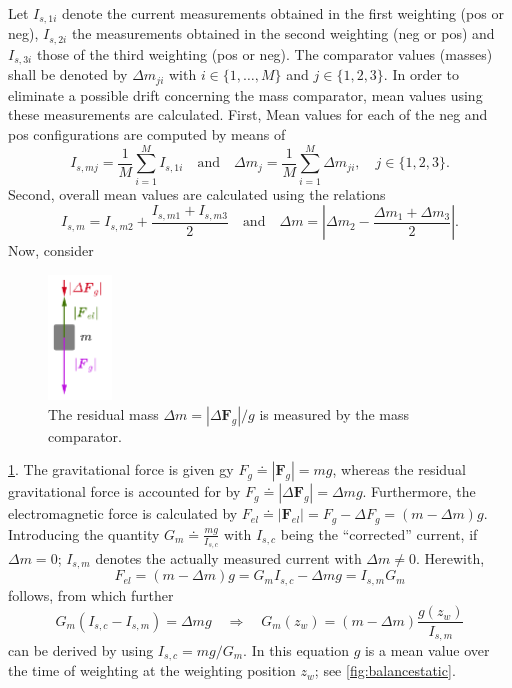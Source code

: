 \documentclass{report}
\numberwithin{tm}{section}
\newcommand\vect[1]{\ensuremath{\bm{#1}}}
\begin{document}
Let $I_{s,1i}$ denote the current measurements obtained in the first weighting (pos or neg), $I_{s,2i}$ the measurements obtained in the second weighting (neg or pos) and $I_{s,3i}$ those of the third weighting (pos or neg). The comparator values (masses) shall be denoted by $\Delta m_{ji}$ with $ i \in \{1,\dots,M\}$ and $j \in \{1,2,3\}$. In order to eliminate a possible drift concerning the mass comparator, mean values using these measurements are calculated. First, Mean values for each of the neg and pos configurations are computed by means of \begin{equation}
	I_{s,mj} = \frac{1}{M}\sum_{i=1}^{M}I_{s,1i} \quad \text{and} \quad 	\Delta m_{j} = \frac{1}{M}\sum_{i=1}^{M} \Delta m_{ji},\quad j \in \{1,2,3\}.
\end{equation} Second, overall mean values are calculated using the relations \begin{equation}
I_{s,m} =  I_{s,m2} + \frac{I_{s,m1} + I_{s,m3}}{2} \quad \text{and} \quad   \Delta m = \left| \Delta m_2 - \frac{\Delta m_1 + \Delta m_3}{2} \right|.
\end{equation} Now, consider 
\begin{figure}[h]
	\centering
	\includegraphics[width=0.15\textwidth]{figures/currentcalculations.pdf}
	\caption{The residual mass $\Delta m = |\Delta \vect{F}_g|/g$ is measured by the mass comparator.}
	\label{fig:currentcalculations}
\end{figure}
\cref{fig:currentcalculations}. The gravitational force is given gy $F_g \doteq |\vect{F}_g| = m g$, whereas the residual gravitational force is accounted for by $F_g \doteq |\Delta \vect{F}_{g}| = \Delta m g$. Furthermore, the electromagnetic force is calculated by $F_{el} \doteq |\vect{F}_{el}| = F_g - \Delta F_g = (m-\Delta m)g$. Introducing the quantity $G_m \doteq \frac{mg}{I_{s,c}}$ with $I_{s,c}$ being the ``corrected'' current, if $\Delta m = 0$; $I_{s,m}$ denotes the actually measured current with $\Delta m \neq 0$. Herewith, \begin{equation}
		F_{el} = (m-\Delta m)g = G_m I_{s,c}- \Delta m g = I_{s,m}G_m
\end{equation} follows, from which further \begin{equation}
G_m(I_{s,c}-I_{s,m}) = \Delta m g \quad \Rightarrow \quad G_m(z_w) = (m-\Delta m)\frac{g(z_w)}{I_{s,m}}
\end{equation} can be derived by using $I_{s,c} = mg/G_m$. In this equation $g$ is a mean value over the time of weighting at the weighting position $z_w$; see \cref{fig:balancestatic}.
\end{document}

